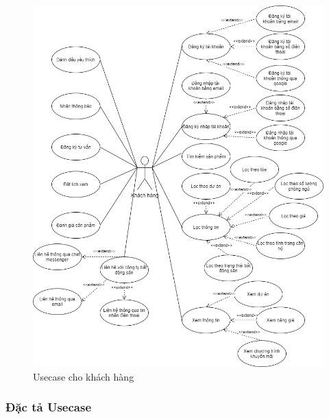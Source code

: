 \documentclass[12pt,a4paper]{article}
\begin{document}
    \begin{figure}[H]
        \centering \includegraphics[width=\textwidth]{Img/Usecase/usecase_khach-hang.png}
        \vspace{0.5cm}
        \caption{Usecase cho khách hàng}
        \label{usecasecustomer}
    \end{figure}



    \subsubsection{Đặc tả Usecase}

\end{document}
